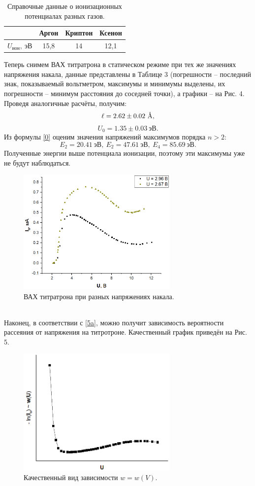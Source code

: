 \documentclass[a4paper,12pt]{article}
\newcommand{\angstrom}{\text{\normalfont\AA}}
\begin{document}
\begin{table}[!h]
\begin{tabular}{|c|c|c|c|}
\hline
                       & Аргон & Криптон & Ксенон \\ \hline
$ U_{ион},~\text{эВ} $ & 15,8  & 14      & 12,1   \\ \hline
\end{tabular}
\centering
\caption{Справочные данные о ионизационных потенциалах разных газов.}
\end{table}

Теперь снимем ВАХ титратрона в статическом режиме при тех же значениях напряжения накала, данные представлены в Таблице 3 (погрешности -- последний знак, показываемый вольтметром, максимумы и минимумы выделены, их погрешности -- минимум расстояния до соседней точки), а графики -- на Рис. 4. Проведя аналогичные расчёты, получим:
\[\ell = 2.62\pm 0.02~\angstrom,\]
\[U_0 = 1.35\pm 0.03~\text{эВ}.\]
Из формулы \eqref{0} оценим значения напряжений максимумов порядка $n > 2$:
\[E_2 = 20.41~\text{эВ},~E_2 = 47.61~\text{эВ},~E_4 = 85.69~\text{эВ}.\]
Полученные энергии выше потенциала ионизации, поэтому эти максимумы уже не будут наблюдаться.
\begin{figure}[h]
\includegraphics[width=0.7\textwidth]{4.png}
\centering
\caption{ВАХ титратрона при разных напряжениях накала.}
\end{figure}\\
Наконец, в соответствии с \eqref{5a}, можно получит зависимость вероятности рассеяния от напряжения на титротроне. Качественный график приведён на Рис. 5. 
\begin{figure}
\includegraphics[width = 0.7\textwidth]{5.png}
\centering
\caption{Качественный вид зависимости $w = w(V)$.}
\end{figure}
\end{document}
